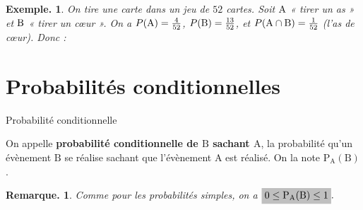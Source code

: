\documentclass[12pt]{article}
\theoremstyle{break}
\newtheorem*{example}{Exemple.}
\newtheorem*{remark}{Remarque.}
\begin{document}
\begin{example}
On tire une carte dans un jeu de $52$ cartes. Soit $\mathrm{A}$ « tirer un as » et $\mathrm{B}$ « tirer un c\oe ur ». On a $P(\mathrm{A})=\frac{4}{52}$, $P(\mathrm{B})=\frac{13}{52}$, et $P(\mathrm{A}\cap \mathrm{B})=\frac{1}{52}$ (l'as de c\oe ur). Donc :
  
  \vspace{0.2em}
  \framebox[1\linewidth]{\parbox{5.5in}{%
  \[
  \hideMW{\P(\A\cup \B) = \frac{4}{52}+\frac{13}{52}-\frac{1}{52} = \frac{16}{52} = \frac{4}{13}.}
  \]
  \vspace{-1em}
  }}
\end{example} 



\vspace{-1em}
\section{Probabilités conditionnelles}

\begin{definition}{Probabilité conditionnelle}{}
  \begin{multihide}
  On appelle \textbf{probabilité conditionnelle de ${\mathrm B}$ sachant ${\mathrm A}$}, la probabilité qu'un évènement ${\mathrm B}$ se réalise sachant que l'évènement ${\mathrm A}$ est réalisé. On la note ${\mathrm P}_{\mathrm A}({\mathrm B})$.
  \end{multihide}
\end{definition}

\begin{remark}
  Comme pour les probabilités simples, on a $\hideM{0 \le {\mathrm P}_{\mathrm A}(\mathrm B) \le 1}.$
\end{remark}
\end{document}
